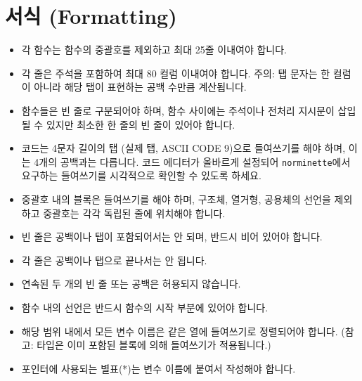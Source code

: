 \documentclass{42-ko}
\begin{document}
    \section{서식 (Formatting)}

            \begin{itemize}

                \item 각 함수는 함수의 중괄호를 제외하고 최대 25줄 이내여야 합니다.

                \item 각 줄은 주석을 포함하여 최대 80 컬럼 이내여야 합니다.
                  주의: 탭 문자는 한 컬럼이 아니라 해당 탭이 표현하는 공백 수만큼
                  계산됩니다.

                \item 함수들은 빈 줄로 구분되어야 하며, 함수 사이에는 주석이나
                  전처리 지시문이 삽입될 수 있지만 최소한 한 줄의 빈 줄이 있어야
                  합니다.

                \item 코드는 4문자 길이의 탭 (실제 탭, ASCII CODE 9)으로
                  들여쓰기를 해야 하며, 이는 4개의 공백과는 다릅니다. 코드
                  에디터가 올바르게 설정되어 \texttt{norminette}에서 요구하는 들여쓰기를
                  시각적으로 확인할 수 있도록 하세요.

                \item 중괄호 { } 내의 블록은 들여쓰기를 해야 하며, 구조체, 열거형,
                  공용체의 선언을 제외하고 중괄호는 각각 독립된 줄에 위치해야 합니다.

                \item 빈 줄은 공백이나 탭이 포함되어서는 안 되며, 반드시 비어 있어야 합니다.

                \item 각 줄은 공백이나 탭으로 끝나서는 안 됩니다.

                \item 연속된 두 개의 빈 줄 또는 공백은 허용되지 않습니다.

                \item 함수 내의 선언은 반드시 함수의 시작 부분에 있어야 합니다.

                \item 해당 범위 내에서 모든 변수 이름은 같은 열에 들여쓰기로 정렬되어야 합니다.
                  (참고: 타입은 이미 포함된 블록에 의해 들여쓰기가 적용됩니다.)

                \item 포인터에 사용되는 별표(*)는 변수 이름에 붙여서 작성해야 합니다.


\end{itemize}
\end{document}
